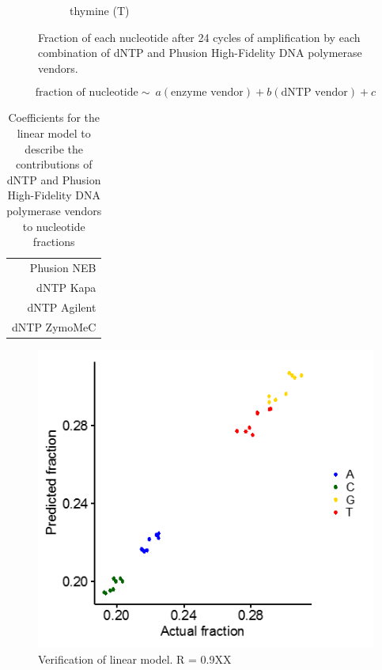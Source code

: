 \documentclass[parskip=full, numbers=noenddot]{scrreprt}
\begin{document}
\begin{figure}[htpb]
\begin{subfigure}[htpb]{0.4\textwidth}
    \caption{thymine (T)}
    \label{fig:linearmodel_t}
  \end{subfigure}
  \caption{Fraction of each nucleotide after 24 cycles of amplification by each combination of dNTP and Phusion High-Fidelity DNA polymerase vendors.}
  \label{fig:linearmodel_nt}
\end{figure}

\begin{equation}
  \label{eqn:linearmodel}
  \textrm{fraction of nucleotide} \sim\ a (\textrm{enzyme vendor}) + b (\textrm{dNTP vendor}) + c
\end{equation}

\begin{table}[htpb]
  \centering
  \begin{tabular}{r}
     \\
    Phusion NEB\\
    dNTP Kapa\\
    dNTP Agilent\\
    dNTP ZymoMeC\\
  \end{tabular}%
  \caption{Coefficients for the linear model to describe the contributions of dNTP and Phusion High-Fidelity DNA polymerase vendors to nucleotide fractions}
  \label{tab:linearmodel_coeffs}
\end{table}

\begin{figure}[htpb]
  \centering
  \includegraphics[width=\textwidth]{linearmodel_plot}
  \caption{Verification of linear model. R = 0.9XX}
  \label{fig:linearmodel_ver}
\end{figure}
\end{document}
